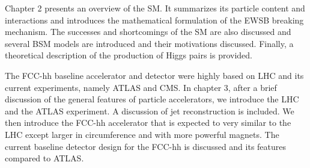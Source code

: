 Chapter 2 presents an overview of the SM. It summarizes its particle content and interactions and introduces the mathematical formulation of the EWSB breaking mechanism. The successes and shortcomings of the SM are also discussed and several BSM models are introduced and their motivations discussed. Finally, a theoretical description of the production of Higgs pairs is provided.

The FCC-hh baseline accelerator and detector were highly based on LHC and its current experiments, namely ATLAS and CMS. In chapter 3, after a brief discussion of the general features of particle accelerators, we introduce the LHC and the ATLAS experiment. A discussion of jet reconstruction is included. We then introduce the FCC-hh accelerator that is expected to very similar to the LHC except larger in circumference and with more powerful magnets. The current baseline detector design for the FCC-hh is discussed and its features compared to ATLAS.  


